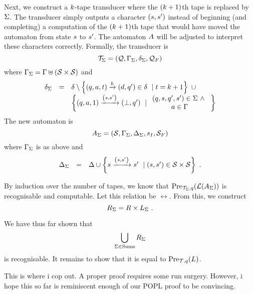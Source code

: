 Next, we construct a $k$-tape transducer where the
$(k+1)$th
tape is replaced by $\Sigma$.
The transducer simply outputs a character
$\left(s, s'\right)$
instead of beginning (and completing) a computation of the
$(k+1)$th
tape that would have moved the automaton from state $s$ to $s'$.
The automaton $A$ will be adjusted to interpret these characters correctly.
Formally, the transducer is
\[
    \mathcal{T}_\Sigma =
        \left(\mathcal{Q}, \Gamma_\Sigma, \delta_\Sigma, \mathcal{Q}_F\right)
\]
where
$\Gamma_\Sigma = \Gamma \uplus \left(\mathcal{S} \times \mathcal{S}\right)$
and
\[
    \begin{array}{rcl}
        \delta_\Sigma
        &=&
        \delta \setminus
            \left\{{
                \left(q,a,t\right) \xrightarrow{b} \left(d,q'\right)
                \in
                \delta
            }\ \mid {t= k+ 1}\right\}
        \ \cup\ \\
        & &
        \left\{{
            \left(q,a,1\right) \xrightarrow{\left(s, s'\right)} \left(\bot,q'\right)
        }\ \mid {
            \begin{array}{c}
                \left(q, s, q', s'\right) \in \Sigma\ \land\ \\
                a\in \Gamma\end{array}
        }\right\}
    \end{array}
\]
The new automaton is
\[
    A_\Sigma =
        \left(
            \mathcal{S},
            \Gamma_\Sigma,
            \Delta_\Sigma,
            s_I,
            \mathcal{S}_F
        \right)
\]
where $\Gamma_\Sigma$ is as above and
\[
    \begin{array}{rcl}
        \Delta_\Sigma
        &=&
        \Delta \cup
            \left\{{s \xrightarrow{\left(s, s'\right)} s'}\ \mid {\left(s, s'\right) \in \mathcal{S}\times \mathcal{S}}\right\} \ .
    \end{array}
\]

By induction over the number of tapes, we know that
${\text{Pre}_{\mathcal{T}_\Sigma,q}}\mathord{\left({\mathcal{L}}\mathord{\left(A_\Sigma\right)}\right)}$
is recognisable and computable.
Let this relation be $\rel$.
From this, we construct
\[
    R_\Sigma = R \times L_\Sigma \ .
\]

We have thus far shown that
\[
    \bigcup\limits_{\Sigma \in \text{Sums}}
        R_\Sigma
\]
is recognisable.
It remains to show that it is equal to
${\text{Pre}_{\mathcal{T},q}}\mathord{\left(L\right)}$.

\begin{remark}
    This is where i cop out.
    A proper proof requires some run surgery.
    However, i hope this so far is reminiscent enough of our POPL proof to be convincing.
\end{remark}
